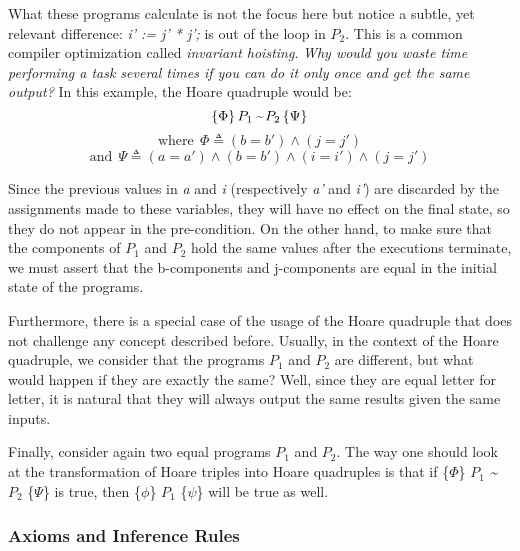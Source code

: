 What these programs calculate is not the focus here but notice a subtle, yet relevant difference: \emph{i' := j' * j';} is out of the loop in \emph{$P_2$}.
This is a common compiler optimization called \emph{invariant hoisting}.
\emph{Why would you waste time performing a task several times if you can do it only once and get the same output?}
In this example, the Hoare quadruple would be:
\[ \{ \Phi \} \, \emph{$P_1$} \, \emph{\textasciitilde} \, \emph{$P_2$} \, \{ \Psi \} \]
\vspace{-20pt} 
\[ \text{where} \ \ \Phi \triangleq (b = b') \land (j = j') \]
\vspace{-25pt} 
\[ \text{and} \ \ \Psi \triangleq (a = a') \land (b = b') \land (i = i') \land (j = j') \]

Since the previous values in \emph{a} and \emph{i} (respectively \emph{a'} and \emph{i'}) are discarded by the assignments made to these variables, they will have no effect on the final state, so they do not appear in the pre-condition.
On the other hand, to make sure that the components of \emph{$P_1$} and \emph{$P_2$} hold the same values after the executions terminate, we must assert that the b-components and j-components are equal in the initial state of the programs. 

Furthermore, there is a special case of the usage of the Hoare quadruple that does not challenge any concept described before.
Usually, in the context of the Hoare quadruple, we consider that the programs \emph{$P_1$} and \emph{$P_2$} are different, but what would happen if they are exactly the same?
Well, since they are equal letter for letter, it is natural that they will always output the same results given the same inputs.

Finally, consider again two equal programs \emph{$P_1$} and \emph{$P_2$}.
The way one should look at the transformation of Hoare triples into Hoare quadruples is that if \{$\Phi$\} \emph{$P_1$} \emph{\textasciitilde} \emph{$P_2$} \{$\Psi$\} is true, then \{$\phi$\} \emph{$P_1$} \{$\psi$\} will be true as well.


\subsubsection{Axioms and Inference Rules}
\label{sub:relational_hoare_logic_formal_proof_rules}

